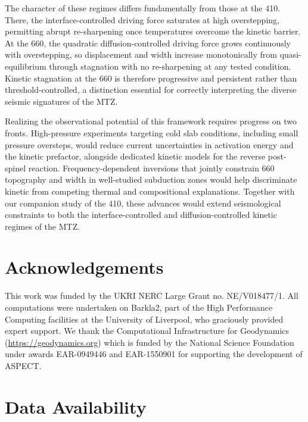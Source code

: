 \documentclass[draft,linenumbers]{agujournal2019}
\begin{document}
The character of these regimes differs fundamentally from those at the
410. There, the interface-controlled driving force saturates at high
overstepping, permitting abrupt re-sharpening once temperatures overcome
the kinetic barrier. At the 660, the quadratic diffusion-controlled
driving force grows continuously with overstepping, so displacement and
width increase monotonically from quasi-equilibrium through stagnation
with no re-sharpening at any tested condition. Kinetic stagnation at the
660 is therefore progressive and persistent rather than
threshold-controlled, a distinction essential for correctly interpreting
the diverse seismic signatures of the MTZ.

Realizing the observational potential of this framework requires
progress on two fronts. High-pressure experiments targeting cold slab
conditions, including small pressure oversteps, would reduce current
uncertainties in activation energy and the kinetic prefactor, alongside
dedicated kinetic models for the reverse post-spinel reaction.
Frequency-dependent inversions that jointly constrain 660 topography and
width in well-studied subduction zones would help discriminate kinetic
from competing thermal and compositional explanations. Together with our
companion study of the 410, these advances would extend seismological
constraints to both the interface-controlled and diffusion-controlled
kinetic regimes of the MTZ.

\clearpage

\section*{Acknowledgements}\label{sec:acknowledgements}

This work was funded by the UKRI NERC Large Grant no. NE/V018477/1. All
computations were undertaken on Barkla2, part of the High Performance
Computing facilities at the University of Liverpool, who graciously
provided expert support. We thank the Computational Infrastructure for
Geodynamics (\url{https://geodynamics.org}) which is funded by the
National Science Foundation under awards EAR-0949446 and EAR-1550901 for
supporting the development of ASPECT.

\section*{Data Availability}\label{sec:data-availability}
\end{document}
